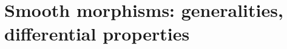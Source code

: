 \documentclass[../main.tex]{subfiles}
\begin{document}
\setcounter{chapter}{1}
\chapter{Smooth morphisms: generalities, differential properties}
\end{document}
